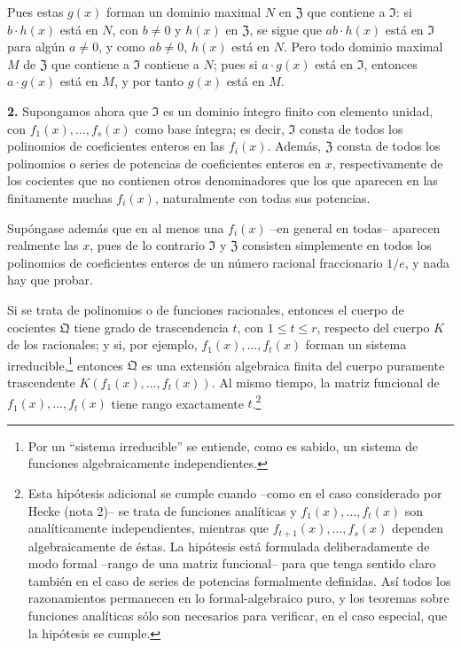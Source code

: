 Pues estas $g(x)$ forman un dominio maximal $N$ en $\mathfrak{Z}$ que contiene a $\mathfrak{I}$: si $b\cdot h(x)$ está en $N$, con $b\ne0$ y $h(x)$ en $\mathfrak{Z}$, se sigue que $ab\cdot h(x)$ está en $\mathfrak{I}$ para algún $a\ne0$, y como $ab\ne0$, $h(x)$ está en $N$. Pero todo dominio maximal $M$ de $\mathfrak{Z}$ que contiene a $\mathfrak{I}$ contiene a $N$; pues si $a\cdot g(x)$ está en $\mathfrak{I}$, entonces $a\cdot g(x)$ está en $M$, y por tanto $g(x)$ está en $M$.

\medskip\noindent\textbf{2.}
Supongamos ahora que $\mathfrak{I}$ es un dominio íntegro finito con elemento unidad, con $f_1(x),\ldots,f_s(x)$ como base íntegra; es decir, $\mathfrak{I}$ consta de todos los polinomios de coeficientes enteros en las $f_i(x)$. Además, $\mathfrak{Z}$ consta de todos los polinomios o series de potencias de coeficientes enteros en $x$, respectivamente de los cocientes que no contienen otros denominadores que los que aparecen en las finitamente muchas $f_i(x)$, naturalmente con todas sus potencias.

Supóngase además que en al menos una $f_i(x)$ --en general en todas-- aparecen realmente las $x$, pues de lo contrario $\mathfrak{I}$ y $\mathfrak{Z}$ consisten simplemente en todos los polinomios de coeficientes enteros de un número racional fraccionario $1/e$, y nada hay que probar.

Si se trata de polinomios o de funciones racionales, entonces el cuerpo de cocientes $\mathfrak{Q}$ tiene grado de trascendencia $t$, con $1\le t\le r$, respecto del cuerpo $K$ de los racionales; y si, por ejemplo, $f_1(x),\ldots,f_t(x)$ forman un sistema irreducible,\footnote{Por un ``sistema irreducible'' se entiende, como es sabido, un sistema de funciones algebraicamente independientes.} entonces $\mathfrak{Q}$ es una extensión algebraica finita del cuerpo puramente trascendente $K(f_1(x),\ldots,f_t(x))$. Al mismo tiempo, la matriz funcional de $f_1(x),\ldots,f_t(x)$ tiene rango exactamente $t$.\footnote{Esta hipótesis adicional se cumple cuando --como en el caso considerado por Hecke (nota 2)-- se trata de funciones analíticas y $f_1(x),\ldots,f_t(x)$ son analíticamente independientes, mientras que $f_{t+1}(x),\ldots,f_s(x)$ dependen algebraicamente de éstas. La hipótesis está formulada deliberadamente de modo formal --rango de una matriz funcional-- para que tenga sentido claro también en el caso de series de potencias formalmente definidas. Así todos los razonamientos permanecen en lo formal-algebraico puro, y los teoremas sobre funciones analíticas sólo son necesarios para verificar, en el caso especial, que la hipótesis se cumple.}


